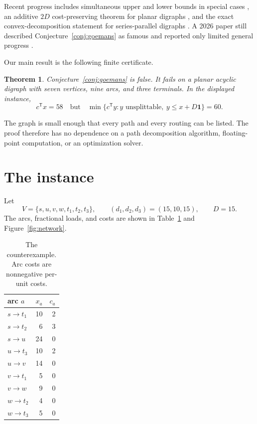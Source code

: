 \documentclass[11pt]{article}
\newtheorem{theorem}{Theorem}
\theoremstyle{definition}
\newcommand{\1}{\mathbf{1}}
\begin{document}
Recent progress includes simultaneous upper and lower bounds in special
cases \citep{MorellSkutella2022}, an additive $2D$ cost-preserving theorem for
planar digraphs \citep{TraubVargasKochZenklusen2024}, and the exact
convex-decomposition statement for series-parallel digraphs
\citep{AlmoghrabiSkutellaWarode2024}.  A 2026 paper still described
Conjecture~\ref{conj:goemans} as famous and reported only limited general
progress \citep{SwamyTraubVargasKochZenklusen2026}.

Our main result is the following finite certificate.

\begin{theorem}\label{thm:main}
Conjecture~\ref{conj:goemans} is false.  It fails on a planar acyclic digraph
with seven vertices, nine arcs, and three terminals.  In the displayed
instance,
\[
 c^\mathsf{T}x=58
 \quad\text{but}\quad
 \min\{c^\mathsf{T}y:y\text{ unsplittable},\ y\le x+D\1\}=60.
\]
\end{theorem}

The graph is small enough that every path and every routing can be listed.
The proof therefore has no dependence on a path decomposition algorithm,
floating-point computation, or an optimization solver.

\section{The instance}

Let
\[
 V=\{s,u,v,w,t_1,t_2,t_3\},
 \qquad
 (d_1,d_2,d_3)=(15,10,15),
 \qquad D=15.
\]
The arcs, fractional loads, and costs are shown in
Table~\ref{tab:instance} and Figure~\ref{fig:network}.

\begin{table}[ht]
\centering
\caption{The counterexample.  Arc costs are nonnegative per-unit costs.}
\label{tab:instance}
\begin{tabular}{@{}lrr@{}}
\toprule
arc $a$ & $x_a$ & $c_a$ \\
\midrule
$s\to t_1$ & 10 & 2 \\
$s\to t_2$ &  6 & 3 \\
$s\to u$   & 24 & 0 \\
$u\to t_3$ & 10 & 2 \\
$u\to v$   & 14 & 0 \\
$v\to t_1$ &  5 & 0 \\
$v\to w$   &  9 & 0 \\
$w\to t_2$ &  4 & 0 \\
$w\to t_3$ &  5 & 0 \\
\bottomrule
\end{tabular}
\end{table}
\end{document}
